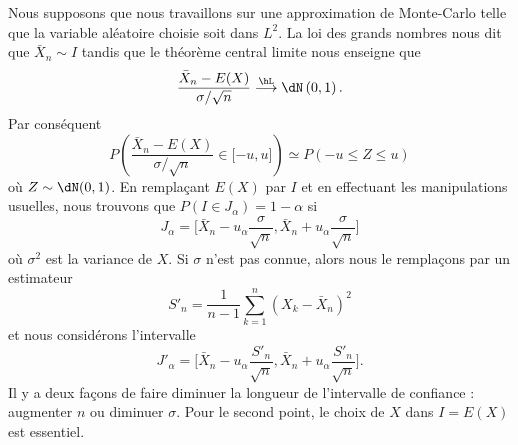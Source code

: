 Nous supposons que nous travaillons sur une approximation de Monte-Carlo telle que la variable aléatoire choisie soit dans \( L^2\). La loi des grands nombres nous dit que \( \bar X_n\sim I\) tandis que le théorème central limite nous enseigne que
\begin{equation}
	\frac{ \bar X_n-E(X) }{ \sigma/\sqrt{n} }\stackrel{\hL}{\longrightarrow}\dN\left( 0,1 \right).
\end{equation}
Par conséquent
\begin{equation}
	P\left( \frac{ \bar X_n-E(X) }{ \sigma/\sqrt{n} }\in\mathopen[ -u , u \mathclose] \right)\simeq P(-u\leq Z\leq u)
\end{equation}
où \( Z\sim\dN(0,1)\). En remplaçant \( E(X)\) par \( I\) et en effectuant les manipulations usuelles, nous trouvons que \( P(I\in J_{\alpha})=1-\alpha\) si
\begin{equation}
	J_{\alpha}=\big[ \bar X_n-u_{\alpha}\frac{ \sigma }{ \sqrt{n} },\bar X_n+u_{\alpha}\frac{ \sigma }{ \sqrt{n} } \big]
\end{equation}
où \( \sigma^2\) est la variance de \( X\). Si \( \sigma\) n'est pas connue, alors nous le remplaçons par un estimateur
\begin{equation}
	S'_n=\frac{1}{ n-1 }\sum_{k=1}^n(X_k-\bar X_n)^2
\end{equation}
et nous considérons l'intervalle
\begin{equation}
	J'_{\alpha}=\big[ \bar X_n-u_{\alpha}\frac{ S'_n }{ \sqrt{n} },\bar X_n+u_{\alpha}\frac{ S'_n }{ \sqrt{n} } \big].
\end{equation}
Il y a deux façons de faire diminuer la longueur de l'intervalle de confiance : augmenter \( n\) ou diminuer \( \sigma\). Pour le second point, le choix de \( X\) dans \( I=E(X)\) est essentiel.

